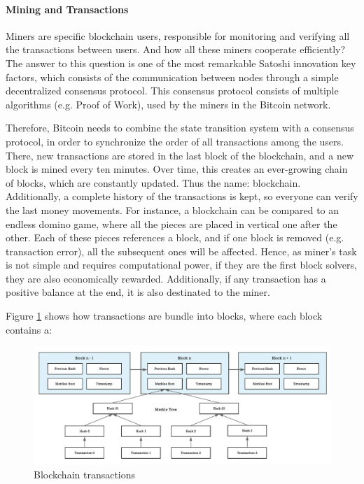 \paragraph{Mining and Transactions}

Miners are specific blockchain users, responsible for monitoring and verifying all the transactions between users. And how all these miners cooperate efficiently? The answer to this question is one of the most remarkable Satoshi innovation key factors, which consists of the communication between nodes through a simple decentralized consensus protocol. This consensus protocol consists of multiple algorithms (e.g. Proof of Work), used by the miners in the Bitcoin network.

Therefore, Bitcoin needs to combine the state transition system with a consensus protocol, in order to synchronize the order of all transactions among the users. There, new transactions are stored in the last block of the blockchain, and a new block is mined every ten minutes. Over time, this creates an ever-growing chain of blocks, which are constantly updated. Thus the name: blockchain. Additionally, a complete history of the transactions is kept, so everyone can verify the last money movements. For instance, a blockchain can be compared to an endless domino game, where all the pieces are placed in vertical one after the other. Each of these pieces references a block, and if one block is removed (e.g. transaction error), all the subsequent ones will be affected. Hence, as miner's task is not simple and requires computational power, if they are the first block solvers, they are also economically rewarded. Additionally, if any transaction has a positive balance at the end, it is also destinated to the miner.

Figure \ref{fig:Blockchain mining} shows how transactions are bundle into blocks, where each block contains a:

\begin{figure}[t]
  	\includegraphics[width=1\linewidth]{gfx/mining}    
  	\caption{Blockchain transactions}
  	\label{fig:Blockchain mining}
\end{figure}

